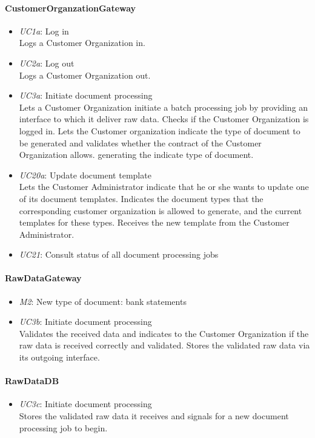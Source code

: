\documentclass[a4paper,10pt]{article}
\begin{document}
\paragraph{CustomerOrganzationGateway}
\begin{itemize}
    \item \emph{UC1a}: Log in\\ Logs a Customer Organization in.
    \item \emph{UC2a}: Log out\\ Logs a Customer Organization out.
    \item \emph{UC3a}: Initiate document processing\\ Lets a Customer Organization initiate a  batch processing job by providing an interface to which it deliver raw data. Checks if the Customer Organization is logged in. Lets the Customer organization indicate the type of document to be generated and validates whether the contract of the Customer Organization allows. generating the indicate type of document.
    \item \emph{UC20a}: Update document template\\ Lets the Customer Administrator indicate that he or she wants to update one of its document templates. Indicates the document types that the corresponding customer organization is allowed to generate, and the current templates for these types. Receives the new template from the Customer Administrator.
    \item \emph{UC21}: Consult status of all document processing jobs
\end{itemize}

\paragraph{RawDataGateway}
\begin{itemize}
	\item \emph{M2}: New type of document: bank statements
    \item \emph{UC3b}: Initiate document processing\\ Validates the received data and indicates to the Customer Organization if the raw data is received correctly and validated. Stores the validated raw data via its outgoing interface.
\end{itemize}

\paragraph{RawDataDB}
\begin{itemize}
	\item \emph{UC3c}: Initiate document processing\\ Stores the validated raw data it receives and signals for a new document processing job to begin. 
\end{itemize}
\end{document}
